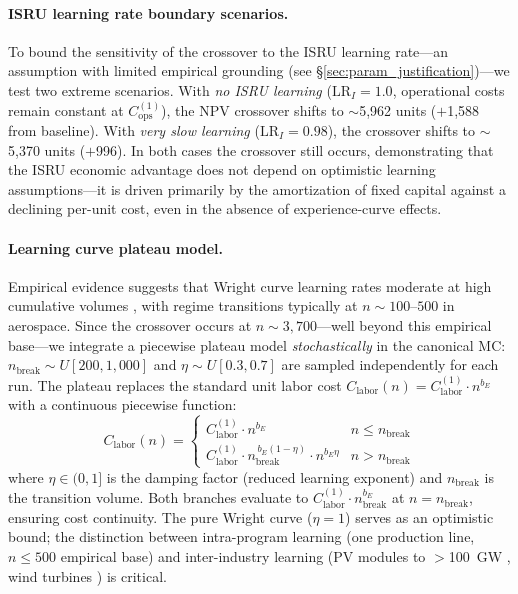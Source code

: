 \documentclass[preprint,12pt]{elsarticle}
\begin{document}
\paragraph{ISRU learning rate boundary scenarios.} To bound the sensitivity of the crossover to the ISRU learning rate---an assumption with limited empirical grounding (see \S\ref{sec:param_justification})---we test two extreme scenarios. With \emph{no ISRU learning} ($\mathrm{LR}_I = 1.0$, operational costs remain constant at $C_{\mathrm{ops}}^{(1)}$), the NPV crossover shifts to $\sim$5{,}962 units ($+$1{,}588 from baseline). With \emph{very slow learning} ($\mathrm{LR}_I = 0.98$), the crossover shifts to $\sim$5{,}370 units ($+$996). In both cases the crossover still occurs, demonstrating that the ISRU economic advantage does not depend on optimistic learning assumptions---it is driven primarily by the amortization of fixed capital against a declining per-unit cost, even in the absence of experience-curve effects.

\paragraph{Learning curve plateau model.} Empirical evidence suggests that Wright curve learning rates moderate at high cumulative volumes \cite{argote1990,thompson2012,benkard2000}, with regime transitions typically at $n \sim 100$--$500$ in aerospace. Since the crossover occurs at $n \sim 3{,}700$---well beyond this empirical base---we integrate a piecewise plateau model \emph{stochastically} in the canonical MC: $n_{\mathrm{break}} \sim U[200, 1{,}000]$ and $\eta \sim U[0.3, 0.7]$ are sampled independently for each run. The plateau replaces the standard unit labor cost $C_{\mathrm{labor}}(n) = C_{\mathrm{labor}}^{(1)} \cdot n^{b_E}$ with a continuous piecewise function:
\begin{equation}
  C_{\mathrm{labor}}(n) = \begin{cases}
    C_{\mathrm{labor}}^{(1)} \cdot n^{b_E} & n \leq n_{\mathrm{break}} \\[4pt]
    C_{\mathrm{labor}}^{(1)} \cdot n_{\mathrm{break}}^{\,b_E(1-\eta)} \cdot n^{b_E \eta} & n > n_{\mathrm{break}}
  \end{cases}
\end{equation}
where $\eta \in (0,1]$ is the damping factor (reduced learning exponent) and $n_{\mathrm{break}}$ is the transition volume. Both branches evaluate to $C_{\mathrm{labor}}^{(1)} \cdot n_{\mathrm{break}}^{b_E}$ at $n = n_{\mathrm{break}}$, ensuring cost continuity. The pure Wright curve ($\eta = 1$) serves as an optimistic bound; the distinction between intra-program learning (one production line, $n \leq 500$ empirical base) and inter-industry learning (PV modules to $>$100~GW \cite{kavlak2018}, wind turbines \cite{rubin2015}) is critical.
\end{document}
